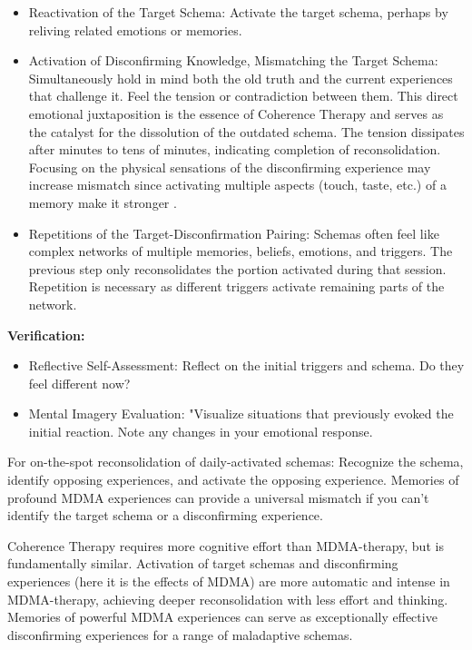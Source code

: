 \documentclass[12pt,letterpaper]{article}
\begin{document}
\begin{itemize}
    \item Reactivation of the Target Schema: Activate the target schema, perhaps by reliving related emotions or memories.
    \item Activation of Disconfirming Knowledge, Mismatching the Target Schema: Simultaneously hold in mind both the old truth and the current experiences that challenge it. Feel the tension or contradiction between them. This direct emotional juxtaposition is the essence of Coherence Therapy and serves as the catalyst for the dissolution of the outdated schema. The tension dissipates after minutes to tens of minutes, indicating completion of reconsolidation. Focusing on the physical sensations of the disconfirming experience may increase mismatch since activating multiple aspects (touch, taste, etc.) of a memory make it stronger \cite{brownAttachmentDisturbances,mayerMultimedia}.   
    \item Repetitions of the Target-Disconfirmation Pairing: Schemas often feel like complex networks of multiple memories, beliefs, emotions, and triggers. The previous step only reconsolidates the portion activated during that session. Repetition is necessary as different triggers activate remaining parts of the network.
\end{itemize}
\noindent \textbf{Verification:}
\begin{itemize}
    \item Reflective Self-Assessment: Reflect on the initial triggers and schema. Do they feel different now?
    \item Mental Imagery Evaluation: "Visualize situations that previously evoked the initial reaction. Note any changes in your emotional response.
\end{itemize}
For on-the-spot reconsolidation of daily-activated schemas: Recognize the schema, identify opposing experiences, and activate the opposing experience. Memories of profound MDMA experiences can provide a universal mismatch if you can't identify the target schema or a disconfirming experience. 

Coherence Therapy requires more cognitive effort than MDMA-therapy, but is fundamentally similar. Activation of target schemas and disconfirming experiences (here it is the effects of MDMA) are more automatic and intense in MDMA-therapy, achieving deeper reconsolidation with less effort and thinking. Memories of powerful MDMA experiences can serve as exceptionally effective disconfirming experiences for a range of maladaptive schemas. 
\end{document}
